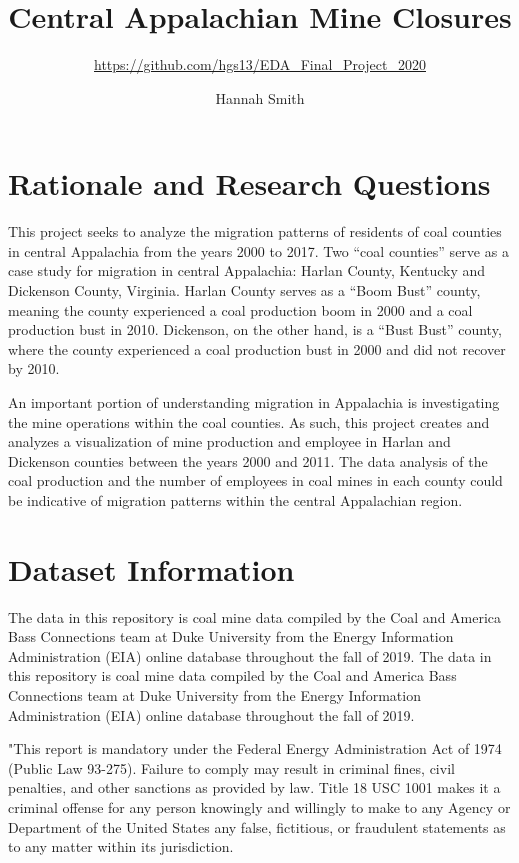 \documentclass[12pt,]{article}
\title{Central Appalachian Mine Closures}
\subtitle{\url{https://github.com/hgs13/EDA_Final_Project_2020}}
\author{Hannah Smith}
\date{}
\begin{document}
\maketitle

\newpage
\tableofcontents 
\newpage
\listoftables 
\newpage
\listoffigures 
\newpage

\hypertarget{rationale-and-research-questions}{%
\section{Rationale and Research
Questions}\label{rationale-and-research-questions}}

This project seeks to analyze the migration patterns of residents of
coal counties in central Appalachia from the years 2000 to 2017. Two
``coal counties'' serve as a case study for migration in central
Appalachia: Harlan County, Kentucky and Dickenson County, Virginia.
Harlan County serves as a ``Boom Bust'' county, meaning the county
experienced a coal production boom in 2000 and a coal production bust in
2010. Dickenson, on the other hand, is a ``Bust Bust'' county, where the
county experienced a coal production bust in 2000 and did not recover by
2010.

An important portion of understanding migration in Appalachia is
investigating the mine operations within the coal counties. As such,
this project creates and analyzes a visualization of mine production and
employee in Harlan and Dickenson counties between the years 2000 and
2011. The data analysis of the coal production and the number of
employees in coal mines in each county could be indicative of migration
patterns within the central Appalachian region.

\newpage

\hypertarget{dataset-information}{%
\section{Dataset Information}\label{dataset-information}}

The data in this repository is coal mine data compiled by the Coal and
America Bass Connections team at Duke University from the Energy
Information Administration (EIA) online database throughout the fall of
2019. The data in this repository is coal mine data compiled by the Coal
and America Bass Connections team at Duke University from the Energy
Information Administration (EIA) online database throughout the fall of
2019.

"This report is mandatory under the Federal Energy Administration Act of
1974 (Public Law 93-275). Failure to comply may result in criminal
fines, civil penalties, and other sanctions as provided by law. Title 18
USC 1001 makes it a criminal offense for any person knowingly and
willingly to make to any Agency or Department of the United States any
false, fictitious, or fraudulent statements as to any matter within its
jurisdiction.
\end{document}
